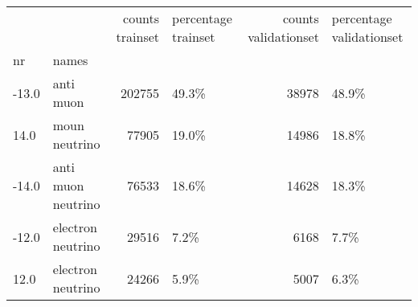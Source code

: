 \begin{tabular}{llrlrl}
\toprule
      &                   &  counts trainset & percentage trainset &  counts validationset & percentage validationset \\
nr & names &                  &                     &                       &                          \\
\midrule
-13.0 & anti muon &           202755 &               49.3\% &                 38978 &                    48.9\% \\
 14.0 & moun neutrino &            77905 &               19.0\% &                 14986 &                    18.8\% \\
-14.0 & anti muon neutrino &            76533 &               18.6\% &                 14628 &                    18.3\% \\
-12.0 & electron neutrino &            29516 &                7.2\% &                  6168 &                     7.7\% \\
 12.0 & electron neutrino &            24266 &                5.9\% &                  5007 &                     6.3\% \\
\bottomrule
\end{tabular}
